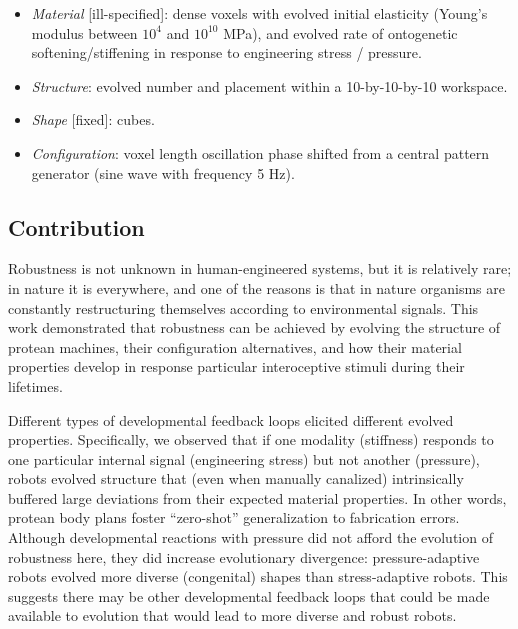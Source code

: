 \begin{itemize}
    \item \textit{Material} [ill-specified]: dense voxels with evolved initial elasticity (Young's modulus between $10^4$ and $10^{10}$ MPa), and evolved rate of ontogenetic softening/stiffening in response to engineering stress / pressure.
    \item \textit{Structure}: evolved number and placement within a 10-by-10-by-10 workspace.
    \item \textit{Shape} [fixed]: cubes.
    \item \textit{Configuration}: voxel length oscillation phase shifted from a central pattern generator (sine wave with frequency 5 Hz).
\end{itemize}



\subsection{Contribution}


Robustness is not unknown in human-engineered systems, but it is relatively rare; in nature it is everywhere, and one of the reasons is that in nature organisms are constantly restructuring themselves according to environmental signals.
This work demonstrated that robustness can be achieved by evolving the structure of protean machines, their configuration alternatives, and how
their material properties develop in response particular interoceptive stimuli during their lifetimes.

Different types of developmental feedback loops elicited different evolved properties.
Specifically, we observed that if one modality (stiffness) responds to one particular internal signal (engineering stress) but not another (pressure), robots evolved structure that (even when manually canalized) intrinsically buffered large deviations from their expected material properties.
In other words, protean body plans foster ``zero-shot'' generalization to fabrication errors.
Although developmental reactions with pressure did not afford the evolution of robustness here, they did increase evolutionary divergence: 
pressure-adaptive robots evolved more diverse 
(congenital) 
shapes than stress-adaptive robots.
This suggests
there may be other developmental feedback loops that could be made available to evolution
that would lead to more diverse and robust robots.




